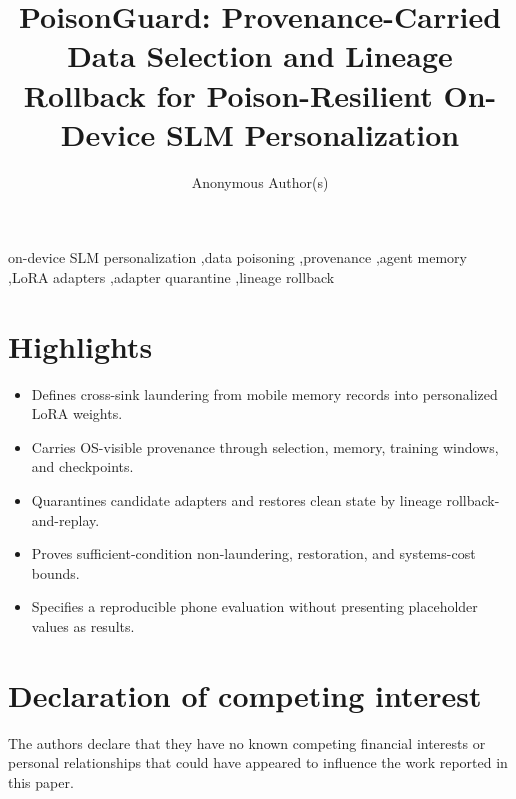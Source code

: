 \documentclass[preprint,12pt]{elsarticle}
\theoremstyle{remark}
\begin{document}
\begin{frontmatter}

\title{PoisonGuard: Provenance-Carried Data Selection and Lineage Rollback for Poison-Resilient On-Device SLM Personalization}

\author[inst1]{Anonymous Author(s)}
\address[inst1]{Affiliation withheld for review}

\begin{abstract}

\end{abstract}

\begin{keyword}
on-device SLM personalization \sep data poisoning \sep provenance \sep agent memory \sep LoRA adapters \sep adapter quarantine \sep lineage rollback
\end{keyword}

\end{frontmatter}

\section*{Highlights}
\begin{itemize}
  \item Defines cross-sink laundering from mobile memory records into personalized LoRA weights.
  \item Carries OS-visible provenance through selection, memory, training windows, and checkpoints.
  \item Quarantines candidate adapters and restores clean state by lineage rollback-and-replay.
  \item Proves sufficient-condition non-laundering, restoration, and systems-cost bounds.
  \item Specifies a reproducible phone evaluation without presenting placeholder values as results.
\end{itemize}














\section*{Declaration of competing interest}
The authors declare that they have no known competing financial interests or personal relationships that could have appeared to influence the work reported in this paper.
\end{document}
